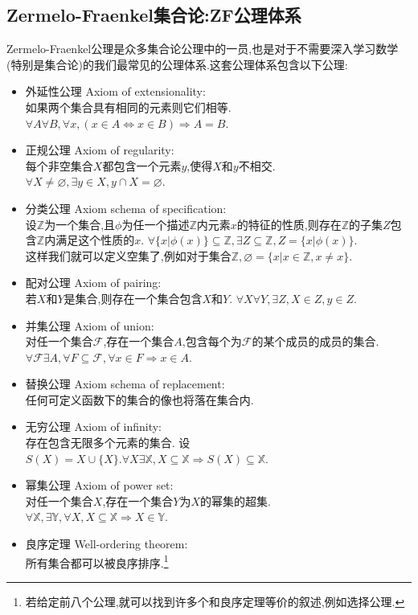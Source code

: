 \documentclass[12pt, a4paper, oneside]{ctexbook}
\begin{document}
  \subsection{Zermelo-Fraenkel集合论:ZF公理体系}
  Zermelo-Fraenkel公理是众多集合论公理中的一员,也是对于不需要深入学习数学(特别是集合论)的我们最常见的公理体系.这套公理体系包含以下公理:
  \begin{itemize}
    \item 外延性公理 Axiom of extensionality:\\
      如果两个集合具有相同的元素则它们相等.
      $\forall A\forall B,\forall x,(x\in A\Leftrightarrow x\in B)\Rightarrow A=B $.
    \item 正规公理 Axiom of regularity:\\
      每个非空集合$X$都包含一个元素$y$,使得$X$和$y$不相交.
      $\forall X\neq \varnothing ,\exists y\in X,y\cap X=\varnothing $.
    \item 分类公理 Axiom schema of specification:\\
      设$\mathbb{Z}$为一个集合,且$\phi$为任一个描述$\mathbb{Z}$内元素$x$的特征的性质,则存在$\mathbb{Z}$的子集$Z$包含$\mathbb{Z}$内满足这个性质的$x$.
      $\forall \{x| \phi(x) \}\subseteq \mathbb{Z},\exists Z\subseteq \mathbb{Z},Z=\{x| \phi(x)\}$.\\
      
      这样我们就可以定义空集了,例如对于集合$\mathbb{Z},\varnothing =\{x|x\in\mathbb{Z}, x\neq x\}$.
    \item 配对公理 Axiom of pairing:\\
      若$X$和$Y$是集合,则存在一个集合包含$X$和$Y$. 
      $\forall X\forall Y, \exists Z,X\in Z,y\in Z $.
    \item 并集公理 Axiom of union:\\
      对任一个集合$\mathcal{F}$,存在一个集合$A$,包含每个为$\mathcal{F}$的某个成员的成员的集合.
      $\forall \mathcal{F}\exists A,\forall F\subseteq\mathcal{F},\forall x\in F\Rightarrow x\in A $.
    \item 替换公理 Axiom schema of replacement:\\
      任何可定义函数下的集合的像也将落在集合内.
    \item 无穷公理 Axiom of infinity:\\
      存在包含无限多个元素的集合.
      设$S(X)=X\cup \{X\}.\forall X \exists \mathbb{X}, X\subseteq \mathbb{X}\Rightarrow S(X)\subseteq \mathbb{X}$.
    \item 幂集公理 Axiom of power set:\\
      对任一个集合$X$,存在一个集合$Y$为$X$的幂集的超集.
      $\forall \mathbb{X},\exists \mathbb{Y},\forall X, X\subseteq \mathbb{X}\Rightarrow X\in\mathbb{Y}$.
    \item 良序定理 Well-ordering theorem:\\
      所有集合都可以被良序排序.\footnote{若给定前八个公理,就可以找到许多个和良序定理等价的叙述,例如选择公理.}
  \end{itemize}
\end{document}
